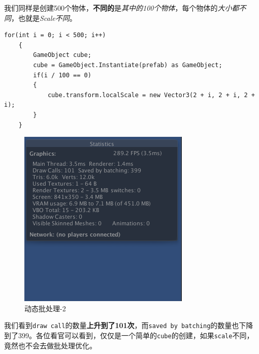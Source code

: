 \documentclass[UTF8,a4paper,12pt]{ctexart}
\begin{document}
	  				我们同样是创建500个物体，\textbf{不同的}是\textit{其中的100个物体}，每个物体的\textit{大小都不同}，也就是\textit{Scale不同}。
	  				\begin{lstlisting}[frame=L, xleftmargin = .079\textwidth]
	for(int i = 0; i < 500; i++)
	{
		GameObject cube;
		cube = GameObject.Instantiate(prefab) as GameObject;
		if(i / 100 == 0)
		{
			cube.transform.localScale = new Vector3(2 + i, 2 + i, 2 + i);
		}
	}
	  				\end{lstlisting}
	  				\begin{figure}[H]
	  					\centering
	  					\includegraphics[scale=0.8]{afterDynamicBatching.png}
	  					\caption{动态批处理-2}
	  				\end{figure}
  				
  				我们看到\verb|draw call|的数量\textbf{上升到了101次}，而\verb|saved by batching|的数量也下降到了399。各位看官可以看到，仅仅是一个简单的\verb|cube|的创建，如果\verb|scale|不同，竟然也不会去做批处理优化。
  				
\end{document}
